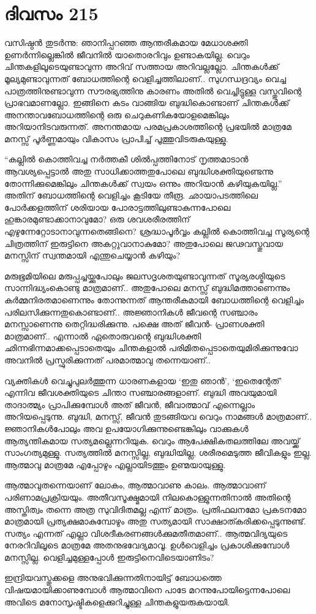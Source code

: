 \section{ദിവസം 215}


വസിഷ്ഠൻ തുടർന്നു: ഞാനിപ്പറഞ്ഞ ആന്തരീകമായ മേധാശക്തി ഉണർന്നില്ലെങ്കിൽ ജീവനില്‍ യാതൊരറിവും ഉണ്ടാകയില്ല. വെറും  ചിന്തകളിലൂടെയുണ്ടാവുന്ന അറിവ് സത്തായ അറിവല്ലല്ലോ. ചിന്തകൾക്ക് മൂല്യമുണ്ടാവുന്നത് ബോധത്തിന്റെ വെളിച്ചത്തിലാണ്‌.. സുഗന്ധദ്രവ്യം വെച്ച പാത്രത്തിനുണ്ടാവുന്ന സൗരഭ്യത്തിനു കാരണം അതിൽ വെച്ചിട്ടുള്ള വസ്തുവിന്റെ പ്രാഭവമാണല്ലോ. ഇങ്ങിനെ കടം വാങ്ങിയ ബുദ്ധികൊണ്ടാണ്‌ ചിന്തകൾക്ക് അനന്താവബോധത്തിന്റെ ഒരു ചെറുകണികയോളമെങ്കിലും  അറിയാനിടവരുന്നത്. അനന്തമായ പരമപ്രകാശത്തിന്റെ പ്രഭയിൽ മാത്രമേ മനസ്സ് പൂർണ്ണമായും വികാസം പ്രാപിച്ച് പൂത്തുവിടരുകയുള്ളു.

“കല്ലിൽ കൊത്തിവച്ച നർത്തകീ ശിൽപ്പത്തിനോട് നൃത്തമാടാൻ ആവശ്യപ്പെട്ടാൽ അതു സാധിക്കാത്തതുപോലെ ബുദ്ധിശക്തിയുണ്ടെന്നു തോന്നിക്കുമെങ്കിലും ചിന്തകൾക്ക് സ്വയം ഒന്നും അറിയാൻ കഴിയുകയില്ല.” അതിന്‌ ബോധത്തിന്റെ വെളിച്ചം കൂടിയേ തീരൂ. ഛായാപടത്തിലെ പോർക്കളത്തിന്‌ ശരിയായ പോരാട്ടത്തിലുണ്ടാകുന്നപോലെ ഹുങ്കാരമുണ്ടാക്കാനാവുമോ? ഒരു ശവശരീരത്തിന്‌ എഴുന്നേറ്റോടാനാവുന്നതെങ്ങിനെ? ശ്രദ്ധാപൂർവ്വം കല്ലിൽ കൊത്തിവച്ച സൂര്യന്റെ ചിത്രത്തിന്‌ ഇരുട്ടിനെ അകറ്റുവാനാകുമോ? അതുപോലെ ജഢവസ്തുവായ മനസ്സിന്‌ സ്വന്തമായി എന്തുചെയ്യാൻ കഴിയും?

മരുഭൂമിയിലെ മരുപ്പച്ചയ്ക്കുപോലും ജലസദൃശതയുണ്ടാവുന്നത് സൂര്യരശ്മിയുടെ സാന്നിദ്ധ്യംകൊണ്ടു മാത്രമാണ്‌.. അതുപോലെ മനസ്സ് ബുദ്ധിമത്താണെന്നും കർമ്മനിരതമാണെന്നും തോന്നുന്നത് ആന്തരീകമായി ബോധത്തിന്റെ വെളിച്ചം  പരിലസിക്കുന്നതുകൊണ്ടാണ്‌.. അജ്ഞാനികൾ ജീവന്റെ സഞ്ചാരം മനസ്സാണെന്നു തെറ്റിദ്ധരിക്കുന്നു. പക്ഷെ അത് ജീവൻ- പ്രാണശക്തി മാത്രമാണ്‌.. എന്നാൽ ഏതൊരുവന്റെ ബുദ്ധിശക്തി ഛിന്നഭിന്നമാക്കപ്പെടാതെയും ചിന്തകളാൽ പരിമിതപ്പെടാതെയുമിരിക്കുന്നുവോ അവനിൽ പ്രസ്ഫുരിക്കുന്നത് പരമാത്മാവു തന്നെയാണ്‌..

വ്യക്തികൾ വെച്ചുപുലർത്തുന്ന ധാരണകളായ ‘ഇതു ഞാൻ’, ‘ഇതെന്റേത്’ എന്നിവ ജീവശക്തിയുടെ ചിന്താ സഞ്ചാരങ്ങളാണ്‌. ബുദ്ധി അവയുമായി താദാത്മ്യം പ്രാപിക്കുമ്പോൾ അത് ജീവൻ, ജീവാത്മാവ് എന്നെല്ലാം അറിയപ്പെടുന്നു. ബുദ്ധി, മനസ്സ്, ജീവൻ തുടങ്ങിയവ വെറും നാമങ്ങൾ മാത്രമാണ്‌.. ജ്ഞാനികൾപോലും അവ ഉപയോഗിക്കുന്നുണ്ടെങ്കിലും വാക്കുകള്‍ ആത്യന്തികമായ സത്യമല്ലെന്നറിയുക. വെറും ആപേക്ഷികതലത്തിലേ അവയ്ക്ക് സാംഗത്യമുള്ളു. സത്യത്തിൽ മനസ്സില്ല, ബുദ്ധിയില്ല, ശരീരമെടുത്ത ജീവികളും ഇല്ല. ആത്മാവു മാത്രമേ എപ്പോഴും എല്ലായിടത്തും ഉണ്മയായുള്ളു.

ആത്മാവുതന്നെയാണ്‌ ലോകം, ആത്മാവാണു കാലം. ആത്മാവാണ്‌ പരിണാമപ്രക്രിയയും. അതീവസൂക്ഷ്മമായി നിലകൊള്ളുന്നതിനാൽ അതിന്റെ അസ്തിത്വം തന്നെ അത്ര സുവിദിതമല്ല എന്ന് മാത്രം. പ്രതിഫലനമോ പ്രകടനമോ മാത്രമായി പ്രത്യക്ഷമാകുമ്പോഴും അതു സത്യമായി സാക്ഷാത്കരിക്കപ്പെടുന്നുണ്ട്. സത്യം എന്നത് എല്ലാ വിശദീകരണങ്ങൾക്കുമതീതമാണ്‌.. ആത്മവിദ്യയുടെ നേരറിവിലൂടെ മാത്രമേ അതനുഭവേദ്യമാവൂ. ഉൾവെളിച്ചം പ്രകാശിക്കുമ്പോൾ മനസ്സില്ല. വെളിച്ചമുള്ളപ്പോൾ ഇരുട്ടിനെവിടെയാണിടം?

ഇന്ദ്രിയവസ്തുക്കളെ അനുഭവിക്കുന്നതിനായിട്ട് ബോധത്തെ വിഷയമായിക്കാണുമ്പോൾ ആത്മാവിനെ പാടേ മറന്നുപോയിട്ടെന്നപോലെ അവിടെ മനോസൃഷ്ടികളെക്കുറിച്ചുള്ള ചിന്തകളുയരുകയായി. 
